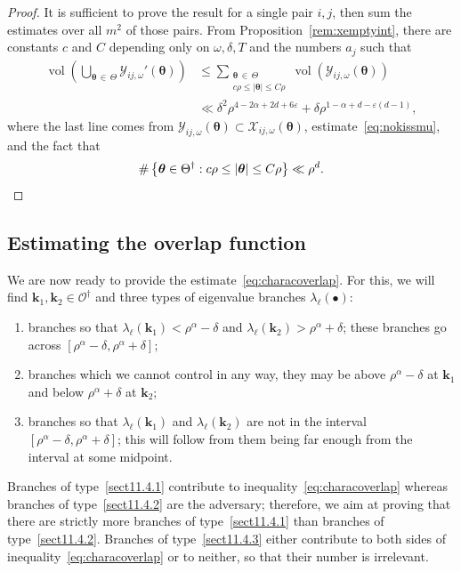 \documentclass[10pt]{amsart}
\theoremstyle{definition}\newtheorem{defi}[theo]{Definition}\newtheorem{rema}[theo]{Remark}\newtheorem{exam}[theo]{Example}\newtheorem{nota}[theo]{Notation}
\DeclareMathOperator{\vol}{vol}
\newcommand{\CO}{\mathcal{O}}
\newcommand{\CX}{\mathcal{X}}
\newcommand{\CY}{\mathcal{Y}}
\newcommand{\btheta}{\boldsymbol \theta}
\newcommand{\bk}{\mathbf k}
\newcommand{\eps}{\varepsilon}
\newcommand{\abs}[1]{\left\lvert #1 \right\rvert}
\newcommand{\set}[1]{\left\{ #1 \right\}}
\begin{document}
\begin{proof}
It is sufficient to prove the result for a single pair $i,j$, then sum the estimates over all $m^2$ of those pairs. From Proposition~\ref{rem:xemptyint}, there are constants $c$ and $C$ depending only on $\omega,\delta,T$ and the numbers $a_j$ such that
\begin{equation}
\begin{aligned}
\vol\left(\bigcup_{\btheta\,\in\,\Theta}\CY_{ij,\omega}'(\btheta)\right) &\le \sum_{\substack{\btheta\,\in\,\Theta \\ c \rho \le \abs\btheta
\le C\rho } }\vol\left(\CY_{ij,\omega}(\btheta) \right)\\
&\ll\delta^2 \rho^{4 - 2\alpha + 2 d + 6 \eps} + \delta \rho^{1-
\alpha + d - \eps(d-1)},
\end{aligned}
\end{equation}
where the last line comes from $\CY_{ij,\omega}(\btheta) \subset
\CX_{ij,\omega}(\btheta)$, estimate~\eqref{eq:nokissmu}, and the fact that
\begin{equation}
\#\set{\btheta \in \Theta^\dagger : c \rho \le \abs \btheta \le C \rho} \ll
\rho^d.\qedhere
\end{equation}
\end{proof}


\subsection{Estimating the overlap function}
We are now ready to provide the estimate~\eqref{eq:characoverlap}. For this, we will find $\bk_1, \bk_2 \in \CO^\dagger$ and three types of eigenvalue branches $\lambda_\ell(\bullet)$:
\begin{enumerate}
\item\label{sect11.4.1} branches so that $\lambda_\ell(\bk_1) < \rho^\alpha - \delta$ and $\lambda_\ell(\bk_2) > \rho^\alpha + \delta$; these branches go across $[\rho^\alpha - \delta, \rho^\alpha + \delta]$;
\item\label{sect11.4.2} branches which we cannot control in any way, they may be above $\rho^\alpha - \delta$ at $\bk_1$ and below $\rho^\alpha + \delta$ at $\bk_2$;
\item\label{sect11.4.3} branches so that $\lambda_\ell(\bk_1)$ and $\lambda_\ell(\bk_2)$ are not in the interval $[\rho^\alpha - \delta,\rho^\alpha + \delta]$; this will follow from them being far enough from the interval at some midpoint.
\end{enumerate}
Branches of type~\eqref{sect11.4.1} contribute to inequality~\eqref{eq:characoverlap} whereas branches of type~\eqref{sect11.4.2} are the adversary; therefore, we aim at proving that there are strictly more branches of type~\eqref{sect11.4.1} than branches of type~\eqref{sect11.4.2}. Branches of type~\eqref{sect11.4.3} either contribute to both sides of inequality~\eqref{eq:characoverlap} or to neither, so that their number is irrelevant.
\end{document}

